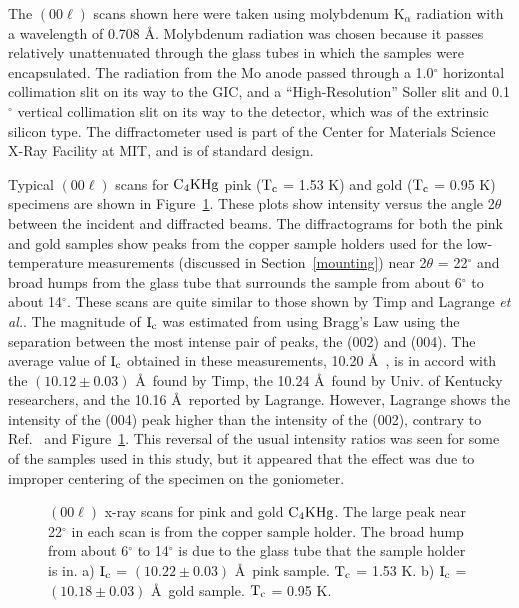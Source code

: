         The  $(00\ell)$ scans  shown  here   were taken  using   molybdenum
K$_{\alpha}$  radiation with   a wavelength  of  0.708    \AA.   Molybdenum
radiation was chosen because it  passes relatively unattenuated through the
glass tubes in which the samples were encapsulated.  The radiation from the
Mo anode passed through a 1.0$^{\circ}$ horizontal collimation  slit on its
way to the   GIC, and a ``High-Resolution''  Soller  slit and 0.1$^{\circ}$
vertical  collimation slit on  its way  to the detector,   which was of the
extrinsic silicon type.  The diffractometer used is part of  the Center for
Materials Science  X-Ray Facility   at MIT, and is  of standard design.

        Typical $(00\ell)$ scans for $\rm C_4KHg$ pink ($\rm T_c$ = 1.53 K)
and  gold ($\rm  T_c$ = 0.95 K) specimens  are shown in Figure~\ref{stixr}.
These plots show intensity versus the angle  2$\theta$ between the incident
and diffracted beams.    The diffractograms  for both the   pink  and  gold
samples show   peaks  from  the   copper  sample  holders  used    for  the
low-temperature  measurements  (discussed in   Section~\ref{mounting}) near
2$\theta$ = 22$^{\circ}$ and broad humps from the glass tube that surrounds
the sample from about 6$^{\circ}$ to  about 14$^{\circ}$.  These  scans are
quite  similar to  those  shown by Timp\cite{timp83}  and  Lagrange {\em et
al.\/}\cite{lagrange80b}.   The magnitude of  $\rm I_c$ was  estimated from
using Bragg's  Law using the separation between  the  most intense  pair of
peaks, the (002)  and  (004).  The average value of  $\rm  I_c$ obtained in
these measurements, 10.20
\AA\ ,  is    in   accord   with the    $(10.12  \pm   0.03)$   \AA\   found by
Timp\cite{timp83},  the   10.24   \AA\    found by     Univ.   of    Kentucky
researchers,\cite{yang88}     and the     10.16    \AA\      reported      by
Lagrange.\cite{lagrange80}  However, Lagrange shows  the intensity   of the
(004) peak  higher   than  the  intensity   of  the  (002),   contrary   to
Ref.~\cite{timp83} and   Figure~\ref{stixr}.  This  reversal  of the  usual
intensity ratios was seen for some  of the samples used  in this study, but
it appeared that the effect was due to improper  centering of  the specimen
on the goniometer.

\begin{figure}
\vspace{20cm}
\caption[$(00\ell)$ x-ray scans for pink and gold $\rm C_4KHg$.]{$(00\ell)$
x-ray   scans for    pink and  gold   $\rm C_4KHg$.   The large peak   near
22$^{\circ}$ in each scan is from the copper sample holder.  The broad hump
from about 6$^{\circ}$ to  14$^{\circ}$ is due to the  glass tube  that the
sample holder is  in.  a) $\rm I_c$ =  $(10.22 \pm 0.03)$ \AA\  pink
sample.  $\rm T_c$ = 1.53 K.  b) $\rm I_c$ = $(10.18 \pm 0.03)$ \AA\  gold
sample.  $\rm T_c$ = 0.95 K.}
\label{stixr}
\end{figure}

